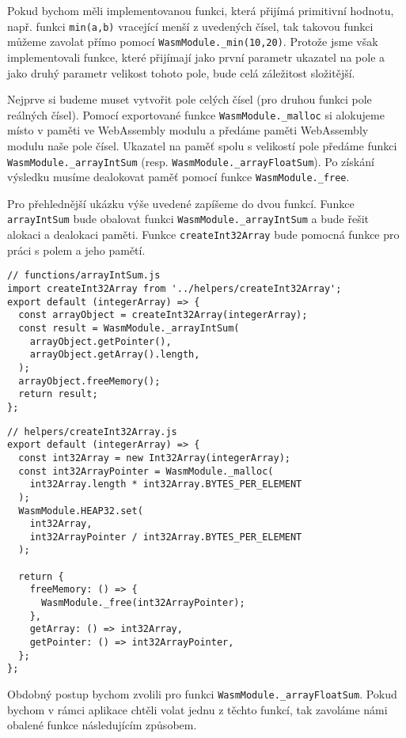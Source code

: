 \documentclass{{template/ctuthesis}}
\begin{document}
Pokud bychom měli implementovanou funkci, která přijímá primitivní hodnotu, např. funkci \texttt{min(a,b)} vracející menší z uvedených čísel, tak takovou funkci můžeme zavolat přímo pomocí \texttt{WasmModule.\_min(10,20)}. Protože jsme však implementovali funkce, které přijímají jako první parametr ukazatel na pole a jako druhý parametr velikost tohoto pole, bude celá záležitost složitější.

Nejprve si budeme muset vytvořit pole celých čísel (pro druhou funkci pole reálných čísel). Pomocí exportované funkce \texttt{WasmModule.\_malloc} si alokujeme místo v paměti ve WebAssembly modulu a předáme paměti WebAssembly modulu naše pole čísel. Ukazatel na paměť spolu s velikostí pole předáme funkci \texttt{WasmModule.\_arrayIntSum} (resp. \texttt{WasmModule.\_arrayFloatSum}). Po získání výsledku musíme dealokovat paměť pomocí funkce \texttt{WasmModule.\_free}.

Pro přehlednější ukázku výše uvedené zapíšeme do dvou funkcí. Funkce \texttt{arrayIntSum} bude obalovat funkci \texttt{WasmModule.\_arrayIntSum} a bude řešit alokaci a dealokaci paměti. Funkce \texttt{createInt32Array} bude pomocná funkce pro práci s polem a jeho pamětí.

\begin{verbatim}
// functions/arrayIntSum.js
import createInt32Array from '../helpers/createInt32Array';
export default (integerArray) => {
  const arrayObject = createInt32Array(integerArray);
  const result = WasmModule._arrayIntSum(
    arrayObject.getPointer(),
    arrayObject.getArray().length,
  );
  arrayObject.freeMemory();
  return result;
};
\end{verbatim}

\begin{verbatim}
// helpers/createInt32Array.js
export default (integerArray) => {
  const int32Array = new Int32Array(integerArray);
  const int32ArrayPointer = WasmModule._malloc(
    int32Array.length * int32Array.BYTES_PER_ELEMENT
  );
  WasmModule.HEAP32.set(
    int32Array,
    int32ArrayPointer / int32Array.BYTES_PER_ELEMENT
  );

  return {
    freeMemory: () => {
      WasmModule._free(int32ArrayPointer);
    },
    getArray: () => int32Array,
    getPointer: () => int32ArrayPointer,
  };
};
\end{verbatim}

Obdobný postup bychom zvolili pro funkci \texttt{WasmModule.\_arrayFloatSum}. Pokud bychom v rámci aplikace chtěli volat jednu z těchto funkcí, tak zavoláme námi obalené funkce následujícím způsobem.
\end{document}
